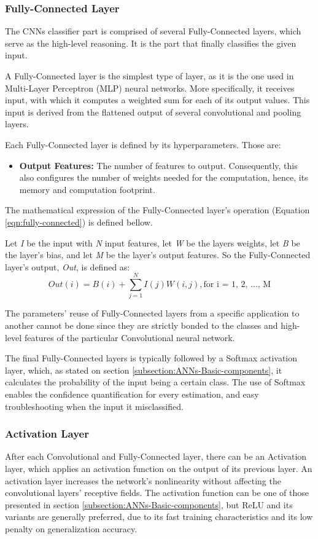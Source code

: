 \subsubsection{Fully-Connected Layer}
The CNNs classifier part is comprised of several Fully-Connected layers, which serve as the high-level reasoning. It is the part that finally classifies the given input.

A Fully-Connected layer is the simplest type of layer, as it is the one used in Multi-Layer Perceptron (MLP) neural networks. More specifically, it receives input, with which it computes a weighted sum for each of its output values. This input is derived from the flattened output of several convolutional and pooling layers.

Each Fully-Connected layer is defined by its hyperparameters. Those are:
\begin{itemize}
	\item \textbf{Output Features:} The number of features to output. Consequently, this also configures the number of weights needed for the computation, hence, its memory and computation footprint.
\end{itemize}

The mathematical expression of the Fully-Connected layer's operation (Equation \ref{eqn:fully-connected}) is defined bellow.

Let \emph{I} be the input with \emph{N} input features, let \emph{W} be the layers weights, let \emph{B} be the layer's bias, and let \emph{M} be the layer's output features. So the Fully-Connected layer's output, \emph{Out}, is defined as:
\begin{equation}
	\label{eqn:fully-connected}
	Out(i) = B(i) + \sum_{j = 1}^{N} I(j)W(i, j), \mbox{for i = 1, 2, ..., M}
\end{equation}

The parameters' reuse of Fully-Connected layers from a specific application to another cannot be done since they are strictly bonded to the classes and high-level features of the particular Convolutional neural network.

The final Fully-Connected layers is typically followed by a Softmax activation layer, which, as stated on section \ref{subsection:ANNs-Basic-components}, it calculates the probability of the input being a certain class. The use of Softmax enables the confidence quantification for every estimation, and easy troubleshooting when the input it misclassified.

\subsubsection{Activation Layer}
After each Convolutional and Fully-Connected layer, there can be an Activation layer, which applies an activation function on the output of its previous layer. An activation layer increases the network's nonlinearity without affecting the convolutional layers' receptive fields. The activation function can be one of those presented in section \ref{subsection:ANNs-Basic-components}, but ReLU and its variants are generally preferred, due to its fast training characteristics and its low penalty on generalization accuracy.

